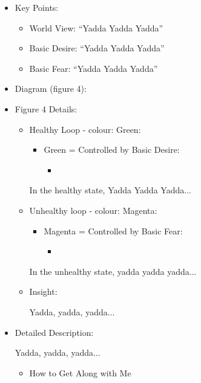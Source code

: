 \documentclass[openleft,oneside,showtrims]{memoir}
\begin{document}
\begin{itemize}
\item Key Points:
\label{sec:orgf1c3ad7}
\begin{itemize}
\item World View: ``Yadda Yadda Yadda''
\item Basic Desire: ``Yadda Yadda Yadda''
\item Basic Fear: ``Yadda Yadda Yadda''
\end{itemize}

\item Diagram (figure 4):
\label{sec:orgd7b8812}

\item Figure 4 Details:
\label{sec:org30a0f06}

\begin{itemize}
\item Healthy Loop - colour: Green:
\label{sec:org337b44e}

\begin{itemize}
\item Green = Controlled by Basic Desire:
\begin{itemize}
\item 
\end{itemize}
\end{itemize}

In the healthy state, Yadda Yadda Yadda...

\item Unhealthy loop - colour: Magenta:
\label{sec:org37a2ebf}

\begin{itemize}
\item Magenta = Controlled by Basic Fear:

\begin{itemize}
\item 
\end{itemize}
\end{itemize}

In the unhealthy state, yadda yadda yadda...

\item Insight:
\label{sec:orgb3fbe61}

Yadda, yadda, yadda...
\end{itemize}

\item Detailed Description:
\label{sec:orgf12a7ed}

Yadda, yadda, yadda...

\begin{itemize}
\item How to Get Along with Me
\label{sec:orgf269680}


\end{itemize}
\end{itemize}
\end{document}
